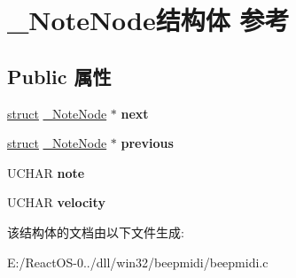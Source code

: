 \hypertarget{struct___note_node}{}\section{\+\_\+\+Note\+Node结构体 参考}
\label{struct___note_node}
\subsection*{Public 属性}
\begin{DoxyCompactItemize}
\item 
\mbox{\label{struct___note_node_a92917b6907d45060bee426e7aada76ae}} 
\hyperlink{interfacestruct}{struct} \hyperlink{struct___note_node}{\+\_\+\+Note\+Node} $\ast$ {\bfseries next}
\item 
\mbox{\label{struct___note_node_a2c4e19f5fd6fa66306d2f26a0a63faba}} 
\hyperlink{interfacestruct}{struct} \hyperlink{struct___note_node}{\+\_\+\+Note\+Node} $\ast$ {\bfseries previous}
\item 
\mbox{\label{struct___note_node_a10b29b716bf70d4e42367f480514a2d8}} 
U\+C\+H\+AR {\bfseries note}
\item 
\mbox{\label{struct___note_node_a8d7060e2be299f5042401be533c1424a}} 
U\+C\+H\+AR {\bfseries velocity}
\end{DoxyCompactItemize}


该结构体的文档由以下文件生成\+:\begin{DoxyCompactItemize}
\item 
E\+:/\+React\+O\+S-\/0../dll/win32/beepmidi/beepmidi.\+c\end{DoxyCompactItemize}
